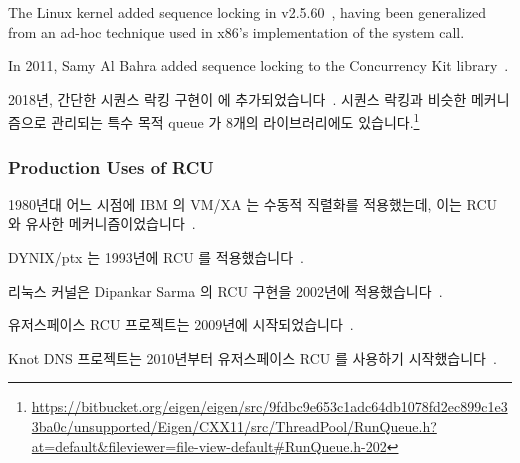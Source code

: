 The Linux kernel added sequence locking in
v2.5.60~\cite{JonathanCorbet2003seqlock}, having been generalized from
an ad-hoc technique used in x86's implementation of the
 system call.

In 2011, Samy Al Bahra added sequence locking to the Concurrency Kit
library~\cite{SamyAlBahra2011ckseqlock}.
\fi

2018년, 간단한 시퀀스 락킹 구현이  에
추가되었습니다~\cite{DavidGoldblatt2018seqlock}.
시퀀스 락킹과 비슷한 메커니즘으로 관리되는 특수 목적 queue 가 8개의
라이브러리에도 있습니다.\footnote{
	\url{https://bitbucket.org/eigen/eigen/src/9fdbc9e653c1adc64db1078fd2ec899c1e33ba0c/unsupported/Eigen/CXX11/src/ThreadPool/RunQueue.h?at=default&fileviewer=file-view-default\#RunQueue.h-202}}
\iffalse

A simple sequence locking implementation was added to \co{jemalloc()}
in 2018~\cite{DavidGoldblatt2018seqlock}.
The eigen library also has a special-purpose queue that is managed by
a mechanism resembling sequence locking.\footnote{
	\url{https://bitbucket.org/eigen/eigen/src/9fdbc9e653c1adc64db1078fd2ec899c1e33ba0c/unsupported/Eigen/CXX11/src/ThreadPool/RunQueue.h?at=default&fileviewer=file-view-default\#RunQueue.h-202}}
\fi

\subsubsection{Production Uses of RCU}
\label{sec:defer:Production Uses of RCU}

1980년대 어느 시점에 IBM 의 VM/XA 는 수동적 직렬화를 적용했는데, 이는 RCU 와
유사한 메커니즘이었습니다~\cite{Hennessy89}.

DYNIX/ptx 는 1993년에 RCU 를 적용했습니다~\cite{McKenney98,Slingwine95}.

리눅스 커널은 Dipankar Sarma 의 RCU 구현을 2002년에
적용했습니다~\cite{Torvalds2.5.43}.
\iffalse

IBM's VM/XA is adopted passive serialization, a mechanism similar to
RCU, some time in the 1980s~\cite{Hennessy89}.

DYNIX/ptx adopted RCU in 1993~\cite{McKenney98,Slingwine95}.

The Linux kernel adopted Dipankar Sarma's implementation of RCU in
2002~\cite{Torvalds2.5.43}.
\fi

유저스페이스 RCU 프로젝트는 2009년에
시작되었습니다~\cite{MathieuDesnoyers2009URCU}.

Knot DNS 프로젝트는 2010년부터 유저스페이스 RCU 를 사용하기
시작했습니다~\cite{LubosSlovak2010KnotDNSRCU}.
\iffalse

